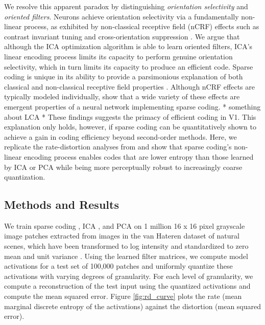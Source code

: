 We resolve this apparent paradox by distinguishing \textit{orientation selectivity} and \textit{oriented filters}. Neurons achieve orientation selectivity via a fundamentally non-linear process, as exhibited by non-classical receptive field (nCRF) effects such as contrast invariant tuning and cross-orientation suppression \parencite{ferster2000natural,  zhu2013visual}. We argue that although the ICA optimization algorithm is able to learn oriented filters, ICA's linear encoding process limits its capacity to perform genuine orientation selectivity, which in turn limits its capacity to produce an efficient code. Sparse coding is unique in its ability to provide a parsimonious explanation of both classical and non-classical receptive field properties \parencite{zhu2013visual, golden2016conjectures}. Although nCRF effects are typically modeled individually,  show that a wide variety of these effects are emergent properties of a neural network implementing sparse coding. * something about LCA * These findings suggests the primacy of efficient coding in V1. This explanation only holds, however, if sparse coding can be quantitatively shown to achieve a gain in coding efficiency beyond second-order methods. Here, we replicate the rate-distortion analyses from  and show that sparse coding's non-linear encoding process enables codes that are lower entropy than those learned by ICA or PCA while being more perceptually robust to increasingly coarse quantization.


\subsection{Methods and Results}
We train sparse coding \parencite{rozell2008sparse}, ICA \parencite{bell1997independent}, and PCA on 1 million 16 x 16 pixel grayscale image patches extracted from images in the van Hateren dataset of natural scenes, which have been transformed to log intensity and standardized to zero mean and unit variance \parencite{vanHateren1998independent}. Using the learned filter matrices, we compute model activations for a test set of 100,000 patches and uniformly quantize these activations with varying degrees of granularity. For each level of granularity, we compute a reconstruction of the test input using the quantized activations and compute the mean squared error. Figure \ref{fig:rd_curve} plots the rate (mean marginal discrete entropy of the activations) against the distortion (mean squared error).

